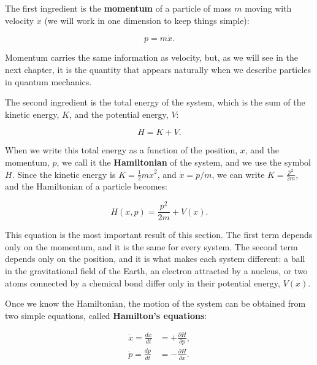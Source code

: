 \documentclass[
  english,
  9pt,
]{extbook}
\theoremstyle{definition}
\theoremstyle{definition}
\theoremstyle{definition}
\theoremstyle{definition}
\theoremstyle{remark}
\begin{document}
The first ingredient is the \textbf{momentum} of a particle of mass \(m\) moving with velocity \(\dot{x}\) (we will work in one dimension to keep things simple):

\begin{equation} 
p = m\dot{x}.
\label{eq:ham1}
\end{equation}

Momentum carries the same information as velocity, but, as we will see in the next chapter, it is the quantity that appears naturally when we describe particles in quantum mechanics.

The second ingredient is the total energy of the system, which is the sum of the kinetic energy, \(K\), and the potential energy, \(V\):

\begin{equation}
H = K + V.
\label{eq:hamdef}
\end{equation}

When we write this total energy as a function of the position, \(x\), and the momentum, \(p\), we call it the \textbf{Hamiltonian} of the system, and we use the symbol \(H\). Since the kinetic energy is \(K=\frac{1}{2}m\dot{x}^2\), and \(\dot{x}=p/m\), we can write \(K=\frac{p^2}{2m}\), and the Hamiltonian of a particle becomes:

\begin{equation} 
H(x,p) = \frac{p^2}{2m} + V(x).
\label{eq:ham2}
\end{equation}

This equation is the most important result of this section. The first term depends only on the momentum, and it is the same for every system. The second term depends only on the position, and it is what makes each system different: a ball in the gravitational field of the Earth, an electron attracted by a nucleus, or two atoms connected by a chemical bond differ only in their potential energy, \(V(x)\).

Once we know the Hamiltonian, the motion of the system can be obtained from two simple equations, called \textbf{Hamilton's equations}:

\begin{equation} 
\begin{aligned}
\dot{x}=\frac{dx}{dt} &= +\frac{\partial H}{\partial p}, \\
\dot{p}=\frac{dp}{dt} &= -\frac{\partial H}{\partial x}.
\end{aligned}
\label{eq:ham3}
\end{equation}
\end{document}
